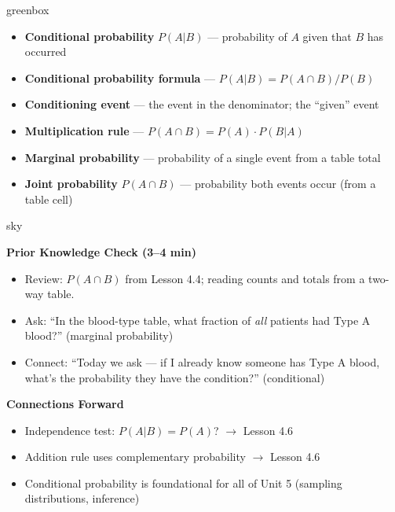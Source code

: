 \documentclass[10pt]{article}
\begin{document}
\begin{skillbox}{greenbox}
\begin{minipage}[t]{0.48\linewidth}
    \begin{itemize}
        \item \textbf{Conditional probability} $P(A|B)$ --- probability of $A$ given that $B$ has occurred
        \item \textbf{Conditional probability formula} --- $P(A|B) = P(A \cap B) / P(B)$
        \item \textbf{Conditioning event} --- the event in the denominator; the ``given'' event
    \end{itemize}
\end{minipage}
\hfill
\begin{minipage}[t]{0.48\linewidth}
    \begin{itemize}
        \item \textbf{Multiplication rule} --- $P(A \cap B) = P(A) \cdot P(B|A)$
        \item \textbf{Marginal probability} --- probability of a single event from a table total
        \item \textbf{Joint probability} $P(A \cap B)$ --- probability both events occur (from a table cell)
    \end{itemize}
\end{minipage}
\end{skillbox}

\begin{skillbox}{sky}
\begin{minipage}[t]{0.48\linewidth}
    \textbf{Prior Knowledge Check (3--4 min)}
    \begin{itemize}
        \item Review: $P(A \cap B)$ from Lesson 4.4; reading counts and totals from a
              two-way table.
        \item Ask: ``In the blood-type table, what fraction of \emph{all} patients had
              Type A blood?'' (marginal probability)
        \item Connect: ``Today we ask --- if I already know someone has Type A blood,
              what's the probability they have the condition?'' (conditional)
    \end{itemize}
\end{minipage}
\hfill
\begin{minipage}[t]{0.48\linewidth}
    \textbf{Connections Forward}
    \begin{itemize}
        \item Independence test: $P(A|B) = P(A)$? $\to$ Lesson 4.6
        \item Addition rule uses complementary probability $\to$ Lesson 4.6
        \item Conditional probability is foundational for all of Unit 5
              (sampling distributions, inference)
    \end{itemize}
\end{minipage}
\end{skillbox}
\end{document}
